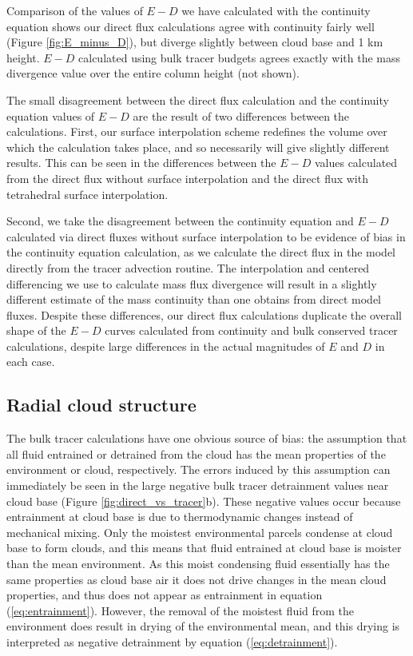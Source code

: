 \documentclass[12pt]{article}
\begin{document}
Comparison of the values of $E-D$ we have calculated with the continuity 
equation shows our direct flux calculations agree with continuity fairly well
(Figure \ref{fig:E_minus_D}), but diverge slightly between cloud base and 1 km
height.  $E-D$ calculated using bulk tracer budgets agrees exactly with the
mass divergence value over the entire column height (not shown).

The small disagreement between the direct flux calculation and the continuity 
equation values of $E-D$ are the result of two differences between the 
calculations.  First, our surface interpolation scheme redefines the volume 
over which the calculation takes place, and so necessarily will give slightly 
different results.  This can be seen in the differences between the $E-D$ 
values calculated from the direct flux without surface interpolation and the 
direct flux with tetrahedral surface interpolation.

Second, we take the disagreement between the continuity equation and $E-D$
calculated via direct fluxes without surface interpolation to be evidence of
bias in the continuity equation calculation, as we calculate the direct flux in
the model directly from the tracer advection routine.  The interpolation and
centered differencing we use to calculate mass flux divergence will result in a
slightly different estimate of the mass continuity than one obtains from direct
model fluxes.  Despite these differences, our direct flux calculations 
duplicate the overall shape of the $E-D$ curves calculated from continuity and 
bulk conserved tracer calculations, despite large differences in the actual
magnitudes of $E$ and $D$ in each case.


\subsection{Radial cloud structure}

The bulk tracer calculations have one obvious source of bias: the assumption 
that all fluid entrained or detrained from the cloud has the mean properties of 
the environment or cloud, respectively.  The errors induced by this assumption 
can immediately be seen in the large negative bulk tracer detrainment values 
near cloud base (Figure \ref{fig:direct_vs_tracer}b).  These negative values 
occur because entrainment at cloud base is due to thermodynamic changes instead 
of mechanical mixing.  Only the moistest environmental parcels condense at 
cloud base to form clouds, and this means that fluid entrained at cloud base is 
moister than the mean environment.  As this moist condensing fluid essentially 
has the same properties as cloud base air it does not drive changes in the mean 
cloud properties, and thus does not appear as entrainment in equation 
(\ref{eq:entrainment}).  However, the removal of the moistest fluid from the 
environment does result in drying of the environmental mean, and this drying is 
interpreted as negative detrainment by equation (\ref{eq:detrainment}).
\end{document}

